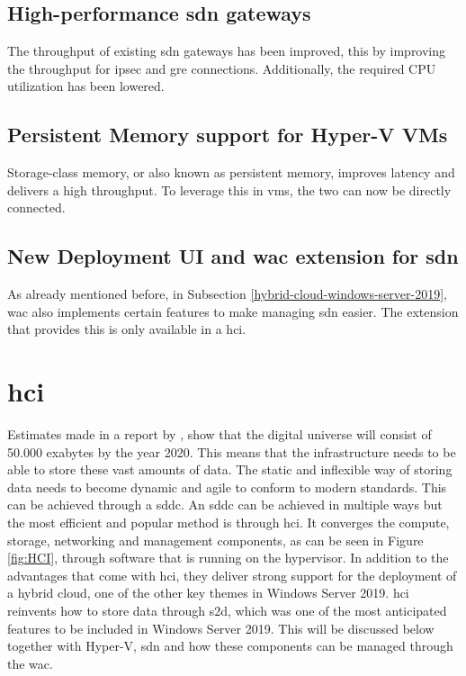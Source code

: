 \subsection*{High-performance \acrshort{sdn} gateways}
The throughput of existing \acrshort{sdn} gateways has been improved, this by improving the throughput for \acrfull{ipsec} and \acrfull{gre} connections. 
Additionally, the required CPU utilization has been lowered.
\subsection*{Persistent Memory support for Hyper-V VMs}
Storage-class memory, or also known as persistent memory, improves latency and delivers a high throughput. 
To leverage this in \acrshort{vm}s, the two can now be directly connected.
\subsection*{New Deployment UI and \acrlong{wac} extension for \acrshort{sdn}}
As already mentioned before, in Subsection \ref{hybrid-cloud-windows-server-2019}, \acrlong{wac} also implements certain features to make managing \acrshort{sdn} easier. 
The extension that provides this is only available in a \acrshort{hci}.

\clearpage

\section{\acrfull{hci}}
Estimates made in a report by \textcite{Gantz2012}, show that the digital universe will consist of 50.000 exabytes by the year 2020. 
This means that the infrastructure needs to be able to store these vast amounts of data. 
The static and inflexible way of storing data needs to become dynamic and agile to conform to modern standards. 
This can be achieved through a \acrfull{sddc}. 
An \acrshort{sddc} can be achieved in multiple ways but the most efficient and popular method is through \acrshort{hci}. 
It converges the compute, storage, networking and management components, as can be seen in Figure \ref{fig:HCI}, through software that is running on the hypervisor. 
In addition to the advantages that come with \acrshort{hci}, they deliver strong support for the deployment of a hybrid cloud, one of the other key themes in Windows Server 2019. 
\acrshort{hci} reinvents how to store data through \acrshort{s2d}, which was one of the most anticipated features to be included in Windows Server 2019. 
This will be discussed below together with Hyper-V, \acrshort{sdn} and how these components can be managed through the \acrlong{wac}. \autocite{Haag2016}

